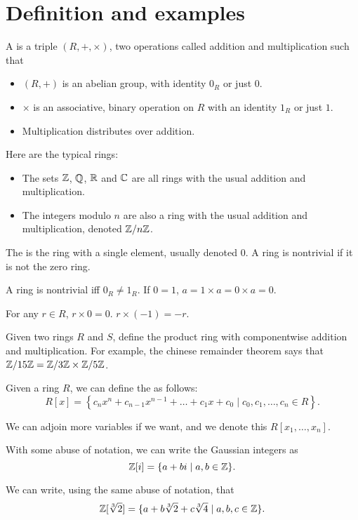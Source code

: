 \documentclass[11pt]{scrreport}
\begin{document}
\section{Definition and examples}
\begin{definition}
    A  is a triple $(R,+,\times)$, two operations called addition and multiplication such that
    \begin{itemize}
        \item $(R,+)$ is an abelian group, with identity $0_R$ or just $0$.
        \item $\times$ is an associative, binary operation on $R$ with an identity $1_R$ or just $1$.
        \item Multiplication distributes over addition.
    \end{itemize}
\end{definition}
\begin{example}
    Here are the typical rings:
    \begin{itemize}
        \item The sets $\mathbb Z$, $\mathbb Q$, $\mathbb R$ and $\mathbb C$ are all rings with the usual addition and multiplication.
        \item The integers modulo $n$ are also a ring with the usual addition and multiplication, denoted $\mathbb Z/n\mathbb Z$.
    \end{itemize}
\end{example}
\begin{definition}
    The  is the ring with a single element, usually denoted $0$. A ring is nontrivial if it is not the zero ring.
\end{definition}
\begin{remark}
    A ring is nontrivial iff $0_R\neq 1_R$. If $0=1$, $a = 1\times a = 0 \times a = 0$.
\end{remark}
\begin{proposition}
    For any $r\in R$, $r\times 0 = 0$. $r \times (-1) = -r$.
\end{proposition}
\begin{example}
    Given two rings $R$ and $S$, define the product ring with componentwise addition and multiplication. For example, the chinese remainder theorem says that $\mathbb Z/15\mathbb Z = \mathbb Z/3\mathbb Z \times \mathbb Z/5\mathbb Z$.
\end{example}
\begin{example}
    Given a ring $R$, we can define the  as follows:
    \[R[x]=\left\{c_nx^n + c_{n-1}x^{n-1} + \dots + c_1x + c_0 \mid c_0, c_1, \dots, c_n \in R\right\}.\]
\end{example}
\begin{example}
    We can adjoin more variables if we want, and we denote this $R[x_1,\dots,x_n]$.
\end{example}
\begin{example}
    With some abuse of notation, we can write the Gaussian integers as \[\mathbb Z[i] = \{a+bi \mid a,b\in \mathbb Z\}.\]
\end{example}
\begin{example}
    We can write, using the same abuse of notation, that \[\mathbb Z[\sqrt[3]{2}] = \{a + b\sqrt[3]{2} + c\sqrt[3]{4} \mid a,b,c \in \mathbb Z\}.\]
\end{example}
\end{document}
